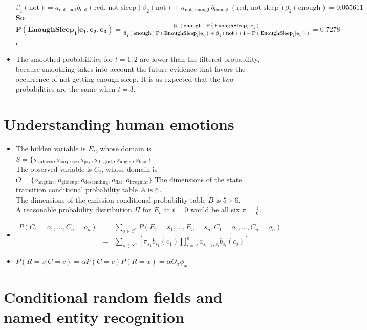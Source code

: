 \documentclass[11pt]{article}
\begin{document}
\begin{onehalfspace}
\begin{itemize}
	$\beta_1(\text{not}) = a_{\text{not, not}}b_{\text{not}}(\text{red, not sleep})\beta_2(\text{not})+a_{\text{not, enough}}b_{\text{enough}}(\text{red, not sleep})\beta_2(\text{enough}) = 0.055611$\\
	\textbf{So $\mathbf{P(EnoughSleep_1|e_1,e_2,e_3) = \frac{\beta_1(\text{enough})P(EnoughSleep_1|e_1)}{\beta_1(\text{enough})P(EnoughSleep_1|e_1)+\beta_1(\text{not})(1-P(EnoughSleep_1|e_1))}=0.7278}$.}\\
	\item
	The smoothed probabilities for $t=1,2$ are lower than the filtered probability, because smoothing takes into account the future evidence that favors the occurrence of not getting enough sleep. It is as expected that the two probabilities are the same when $t=3$.
\end{itemize}

\section{Understanding human emotions}
\begin{itemize}
\item
The hidden variable is $E_t$, whose domain is $S=\{s_{\text{sadness}},s_{\text{surprise}},s_{\text{joy}},s_{\text{disgust}},s_{\text{anger}},s_{\text{fear}}\}$\\
The observed variable is $C_t$, whose domain is $O=\{o_{\text{angular}},o_{\text{glideup}},o_{\text{descending}},o_{\text{flat}},o_{\text{irregular}}\}$
The dimensions of the state transition conditional probability table $A$ is $6\time6$.\\
The dimensions of the emission conditional probability table $B$ is $5\times6$.\\
A reasonable probability distribution $\Pi$ for $E_t$ at $t=0$ would be all six $\pi=\frac{1}{6}$.
\item
\begin{eqnarray*}
P(C_1=o_1,...,C_n=o_n) &=& \sum_{s \in S^n}P(E_1=s_1,...,E_n=s_n,C_1=o_1,...,C_n=o_n)\\
    &=& \sum_{s \in S^n}[\pi_{s_1}b_{s_1}(c_1)\prod_{i=2}^na_{s_{i-1},s_i}b_{s_i}(c_i)]
\end{eqnarray*}
\item
$P(R=x|C=c)=\alpha P(C=c)P(R=x)=\alpha \Theta_x\phi_x$
\end{itemize}

\section{Conditional random fields and named entity recognition}

\end{onehalfspace}
\end{document}
